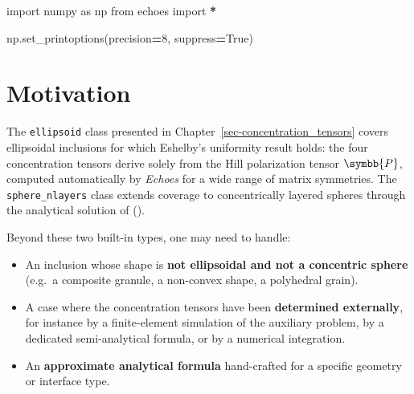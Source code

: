\documentclass[
  a4paper,
  numbers=noendperiod,
  DIV=12]{scrreprt}
\newenvironment{Shaded}{\begin{snugshade}}{\end{snugshade}}
\newcommand{\DecValTok}[1]{\textcolor[rgb]{0.00,0.00,0.81}{#1}}
\newcommand{\ImportTok}[1]{#1}
\newcommand{\NormalTok}[1]{#1}
\newcommand{\OperatorTok}[1]{\textcolor[rgb]{0.81,0.36,0.00}{\textbf{#1}}}
\newcommand{\VariableTok}[1]{\textcolor[rgb]{0.00,0.00,0.00}{#1}}
\providecommand{\tightlist}{%
  \setlength{\itemsep}{0pt}\setlength{\parskip}{0pt}}
\newcommand{\uuuu}[1]{{\symbb{{#1}}}}
\begin{document}
\begin{tcolorbox}[enhanced jigsaw, arc=.35mm, bottomrule=.15mm, bottomtitle=1mm, breakable, colback=white, colbacktitle=quarto-callout-tip-color!10!white, colframe=quarto-callout-tip-color-frame, coltitle=black, left=2mm, leftrule=.75mm, opacityback=0, opacitybacktitle=0.6, rightrule=.15mm, title={Imports}, titlerule=0mm, toprule=.15mm, toptitle=1mm]

\begin{Shaded}
\begin{Highlighting}[]
\ImportTok{import}\NormalTok{ numpy }\ImportTok{as}\NormalTok{ np}
\ImportTok{from}\NormalTok{ echoes }\ImportTok{import} \OperatorTok{*}

\NormalTok{np.set\_printoptions(precision}\OperatorTok{=}\DecValTok{8}\NormalTok{, suppress}\OperatorTok{=}\VariableTok{True}\NormalTok{)}
\end{Highlighting}
\end{Shaded}

\end{tcolorbox}

\section{Motivation}\label{sec-user-motivation}

The \texttt{ellipsoid} class presented in
Chapter~\ref{sec-concentration_tensors} covers ellipsoidal inclusions
for which Eshelby's uniformity result holds: the four concentration
tensors derive solely from the Hill polarization tensor \(\uuuu{P}\),
computed automatically by \emph{Echoes} for a wide range of matrix
symmetries. The \texttt{sphere\_nlayers} class extends coverage to
concentrically layered spheres through the analytical solution of
().

Beyond these two built-in types, one may need to handle:

\begin{itemize}
\tightlist
\item
  An inclusion whose shape is \textbf{not ellipsoidal and not a
  concentric sphere} (e.g.~a composite granule, a non-convex shape, a
  polyhedral grain).
\item
  A case where the concentration tensors have been \textbf{determined
  externally}, for instance by a finite-element simulation of the
  auxiliary problem, by a dedicated semi-analytical formula, or by a
  numerical integration.
\item
  An \textbf{approximate analytical formula} hand-crafted for a specific
  geometry or interface type.
\end{itemize}
\end{document}
